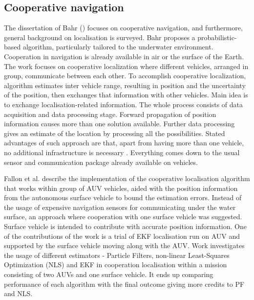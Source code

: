 \subsection{Cooperative navigation}
The dissertation of Bahr (\cite{bahr08}) focuses on cooperative navigation, and furthermore, general background on localisation is surveyed. Bahr proposes a probabilistic-based algorithm, particularly tailored to the underwater environment. Cooperation in navigation is already available in air or the surface of the Earth. The work focuses on cooperative localization where different vehicles, arranged in group, communicate between each other. To accomplish cooperative localization, algorithm estimates inter vehicle range, resulting in position and the uncertainty of the position, then exchanges that information with other vehicles. Main idea is to exchange  localisation-related information. The whole process consists of data acquisition and data processing stage. Forward propagation of position information causes more than one solution available. Further data processing gives an estimate of the location by processing all the possibilities. Stated advantages of such approach are that, apart from having more than one vehicle, no additional infrastructure is necessary \cite{bahr08}. Everything comes down to the usual sensor and communication package already available on vehicles\cite{bahr08}. 

Fallon et al. \cite{fallon10} describe the implementation of the cooperative localisation algorithm that works within group of AUV vehicles, aided with the position information from the autonomous surface vehicle to bound the estimation errors. Instead of the usage of expensive navigation sensors for communicating under the water surface, an approach where cooperation with one surface vehicle was suggested. Surface vehicle is intended to contribute with accurate position information. One of the contributions of the work is a trial of EKF localisation run on AUV and supported by the surface vehicle moving along with the AUV. Work investigates the usage of different estimators - Particle Filters, non-linear Least-Squares Optimization (NLS) and EKF in cooperation localisation within a mission consisting of two AUVs and one surface vehicle. It ends up comparing performance of each algorithm with the final outcome giving more credits to PF and NLS. 